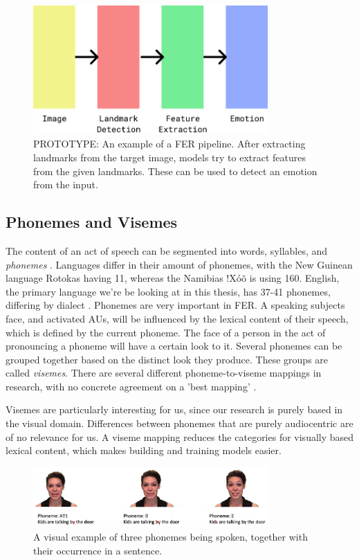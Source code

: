 \begin{figure}
    \centering
    \includegraphics[width=0.8\textwidth]{res/PipelinePrototype.pdf}
    \caption{PROTOTYPE: An example of a FER pipeline. After extracting landmarks from the target image, models try to extract features from the given landmarks. These can be used to detect an emotion from the input.}
    \label{fig:pipeline_fer}
\end{figure}

\subsection{Phonemes and Visemes}
The content of an act of speech can be segmented into words, syllables, and \emph{phonemes} \cite{savin1970nonperceptual}. Languages differ in their amount of phonemes, with the New Guinean language Rotokas having 11, whereas the Namibias !Xóõ is using 160. English, the primary language we're be looking at in this thesis, has 37-41 phonemes, differing by dialect \cite{Hayes2009}. Phonemes are very important in FER. A speaking subjects face, and activated AUs, will be influenced by the lexical content of their speech, which is defined by the current phoneme. The face of a person in the act of pronouncing a phoneme will have a certain look to it. Several phonemes can be grouped together based on the distinct look they produce. These groups are called \emph{visemes}. There are several different phoneme-to-viseme mappings in research, with no concrete agreement on a 'best mapping' \cite{cappelletta2012viseme}.

Visemes are particularly interesting for us, since our research is purely based in the visual domain. Differences between phonemes that are purely audiocentric are of no relevance for us. A viseme mapping reduces the categories for visually based lexical content, which makes building and training models easier.

\begin{figure}
    \centering
    \includegraphics[width=0.8\textwidth]{res/phoneme.png}
    \caption{A visual example of three phonemes being spoken, together with their occurrence in a sentence.}
    \label{fig:phoneme_ex}
\end{figure}

